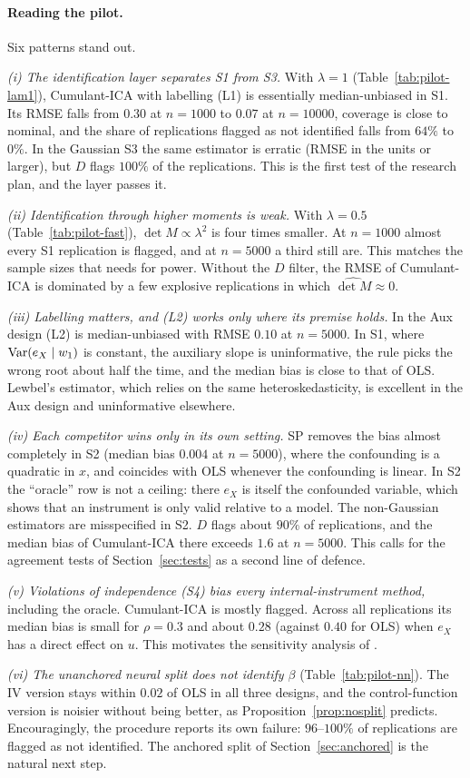 \paragraph{Reading the pilot.} Six patterns stand out.

\emph{(i) The identification layer separates S1 from S3.} With $\lambda=1$
(Table~\ref{tab:pilot-lam1}), Cumulant-ICA with labelling (L1) is essentially median-unbiased in S1.
Its RMSE falls from $0.30$ at $n=1000$ to $0.07$ at $n=10000$, coverage is close to nominal, and the
share of replications flagged as not identified falls from $64\%$ to $0\%$. In the Gaussian S3 the
same estimator is erratic (RMSE in the units or larger), but $D$ flags $100\%$ of the replications.
This is the first test of the research plan, and the layer passes it.

\emph{(ii) Identification through higher moments is weak.} With $\lambda=0.5$
(Table~\ref{tab:pilot-fast}), $\det M\propto\lambda^2$ is four times smaller. At $n=1000$ almost
every S1 replication is flagged, and at $n=5000$ a third still are. This matches the sample sizes
that \citet{delbianco2026} needs for power. Without the $D$ filter, the RMSE of Cumulant-ICA is
dominated by a few explosive replications in which $\widehat{\det M}\approx0$.

\emph{(iii) Labelling matters, and (L2) works only where its premise holds.} In the Aux design
(L2) is median-unbiased with RMSE $0.10$ at $n=5000$. In S1, where $\operatorname{Var}(e_X\mid w_1)$ is constant,
the auxiliary slope is uninformative, the rule picks the wrong root about half the time, and the
median bias is close to that of OLS. Lewbel's estimator, which relies on the same
heteroskedasticity, is excellent in the Aux design and uninformative elsewhere.

\emph{(iv) Each competitor wins only in its own setting.} SP removes the bias almost completely in
S2 (median bias $0.004$ at $n=5000$), where the confounding is a quadratic in $x$, and coincides
with OLS whenever the confounding is linear. In S2 the ``oracle'' row is not a ceiling: there $e_X$
is itself the confounded variable, which shows that an instrument is only valid relative to a
model. The non-Gaussian estimators are misspecified in S2. $D$ flags about $90\%$ of replications,
and the median bias of Cumulant-ICA there exceeds $1.6$ at $n=5000$. This calls for the agreement tests of
Section~\ref{sec:tests} as a second line of defence.

\emph{(v) Violations of independence (S4) bias every internal-instrument method,} including the
oracle. Cumulant-ICA is mostly flagged. Across all replications its median bias is small for $\rho=0.3$ and
about $0.28$ (against $0.40$ for OLS) when $e_X$ has a direct effect on $u$. This motivates the sensitivity analysis of
\citet{conley2012}.

\emph{(vi) The unanchored neural split does not identify $\beta$} (Table~\ref{tab:pilot-nn}). The IV
version stays within $0.02$ of OLS in all three designs, and the control-function version is noisier
without being better, as Proposition~\ref{prop:nosplit} predicts. Encouragingly, the procedure
reports its own failure: $96$--$100\%$ of replications are flagged as not identified. The anchored
split of Section~\ref{sec:anchored} is the natural next step.

